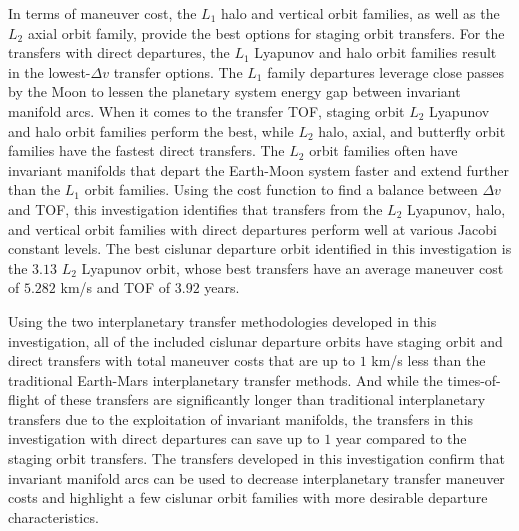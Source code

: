 In terms of maneuver cost, the $L_{1}$ halo and vertical orbit families, as well as the $L_{2}$
axial orbit family, provide the best options for staging orbit transfers. For the transfers with
direct departures, the $L_{1}$ Lyapunov and halo orbit families result in the lowest-$\Delta v$
transfer options. The $L_{1}$ family departures leverage close passes by the Moon to lessen the
planetary system energy gap between invariant manifold arcs. When it comes to the transfer TOF,
staging orbit $L_{2}$ Lyapunov and halo orbit families perform the best, while $L_{2}$ halo, axial,
and butterfly orbit families have the fastest direct transfers. The $L_{2}$ orbit families often
have invariant manifolds that depart the Earth-Moon system faster and extend further than the
$L_{1}$ orbit families. Using the cost function to find a balance between $\Delta v$ and TOF, this
investigation identifies that transfers from the $L_{2}$ Lyapunov, halo, and vertical orbit
families with direct departures perform well at various Jacobi constant levels. The best cislunar
departure orbit identified in this investigation is the $3.13$ $L_{2}$ Lyapunov orbit, whose best
transfers have an average maneuver cost of $5.282$ km/s and TOF of $3.92$ years.

Using the two interplanetary transfer methodologies developed in this investigation, all of the
included cislunar departure orbits have staging orbit and direct transfers with total maneuver
costs that are up to $1$ km/s less than the traditional Earth-Mars interplanetary transfer methods.
And while the times-of-flight of these transfers are significantly longer than traditional
interplanetary transfers due to the exploitation of invariant manifolds, the transfers in this
investigation with direct departures can save up to $1$ year compared to the staging orbit
transfers. The transfers developed in this investigation confirm that invariant manifold arcs can
be used to decrease interplanetary transfer maneuver costs and highlight a few cislunar orbit
families with more desirable departure characteristics.


